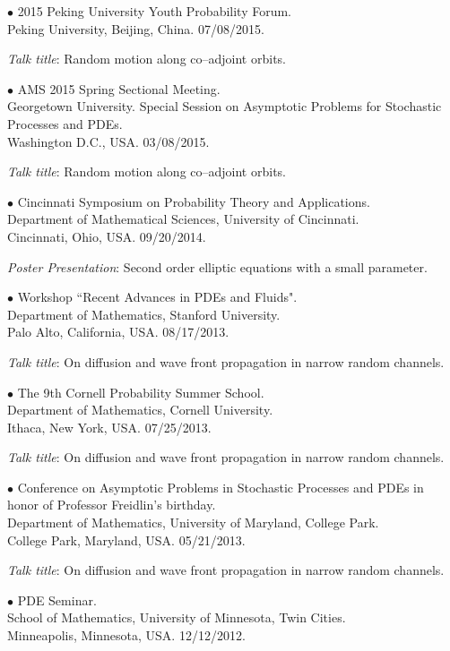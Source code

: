 \documentclass[margin,line]{res}
\begin{document}
\begin{resume}
{$\bullet$ 2015 Peking University Youth Probability Forum. \\ Peking
University, Beijing, China.} \hfill 07/08/2015.

\textit{Talk title}: Random motion along co--adjoint orbits.


{$\bullet$ AMS 2015 Spring Sectional Meeting. \\ Georgetown
University. Special Session on Asymptotic Problems for Stochastic
Processes and PDEs. \\
Washington D.C., USA.} \hfill 03/08/2015.

\textit{Talk title}: Random motion along co--adjoint orbits.


{$\bullet$ Cincinnati Symposium on Probability Theory and Applications. \\
Department of Mathematical Sciences, University of Cincinnati. \\
Cincinnati, Ohio, USA.}
\hfill  09/20/2014.

\textit{Poster Presentation}: Second order elliptic equations with a
small parameter.


{$\bullet$ Workshop ``Recent Advances in PDEs and Fluids".\\
Department of Mathematics, Stanford University. \\
Palo Alto, California, USA.} \hfill  08/17/2013.

\textit{Talk title}: On diffusion and wave front propagation in
narrow random channels.


{$\bullet$ The 9th Cornell Probability Summer School. \\
Department of Mathematics, Cornell University. \\
Ithaca, New York, USA.} \hfill 07/25/2013.

\textit{Talk title}: On diffusion and wave front propagation in
narrow random channels.


{$\bullet$ Conference on Asymptotic Problems in Stochastic Processes
and PDEs in honor of Professor Freidlin's birthday. \\
Department of Mathematics, University of Maryland, College Park. \\
College Park, Maryland, USA.} \hfill 05/21/2013.

\textit{Talk title}: On diffusion and wave front propagation in
narrow random channels.


{$\bullet$ PDE Seminar. \\
School of Mathematics, University of Minnesota, Twin Cities. \\
Minneapolis, Minnesota, USA.} \hfill 12/12/2012.


\end{resume}
\end{document}
